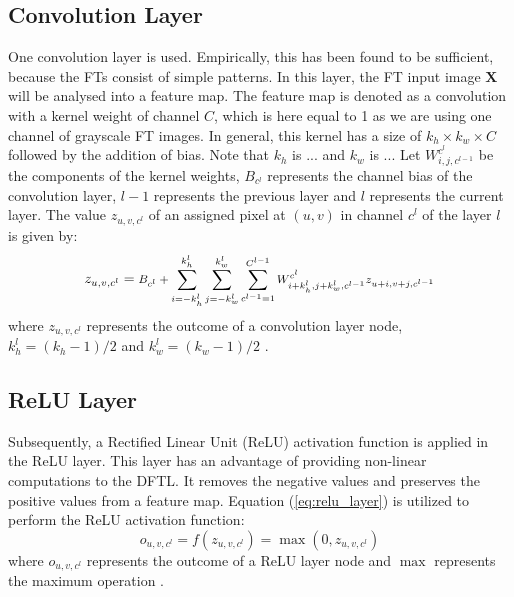 \documentclass[conference]{IEEEtran}
\begin{document}
\subsection{Convolution Layer}
One convolution layer is used. Empirically, this has been found to be sufficient, because the FTs consist of simple patterns. In this layer, the FT input image $\textbf{X}$ will be analysed into a feature map. The feature map is denoted as a convolution with a kernel weight of channel $C$, which is here equal to 1 as we are using one channel of grayscale FT images.  In general, this kernel has a size of $k_h \times k_w \times C$ followed by the addition of bias. Note that $k_h$ is ... and $k_w$ is ... Let $W_{i,j,c^{l-1}}^{c^{l}}$ be the components of the kernel weights, $B_{c^{l}}$ represents the channel bias of the convolution layer, $l-1$ represents the previous layer and $l$ represents the current layer. The value $z_{u,v,c^{l}}$ of an assigned pixel at $(u,v)$ in channel $c^{l}$ of the layer $l$ is given by:
\begin{equation}
z_{u,v,c^{l}}= \text{\footnotesize $B_{c^{l}}+\sum_{i=-k_h^{l}}^{k_h^{l}}\sum_{j=-k_w^{l}}^{k_w^{l}}\sum_{c^{l-1}=1}^{C^{l-1}} W_{i+k_h^{l},j+k_w^{l},c^{l-1}}^{c^{l}} z_{u+i,v+j,c^{l-1}}$}
\label{eq:conv_layer}
\end{equation}
where $z_{u,v,c^{l}}$ represents the outcome of a convolution layer node, $k_h^{l}=(k_h-1)/2$ and $k_w^{l}=(k_w-1)/2$ \cite{simo2016learning}. 

\subsection{ReLU Layer}
Subsequently, a Rectified Linear Unit (ReLU) activation function is applied in the ReLU layer. This layer has an advantage of providing non-linear computations to the DFTL. It removes the negative values and preserves the positive values from a feature map. Equation (\ref{eq:relu_layer}) is utilized to perform the ReLU activation function:
\begin{equation}
o_{u,v,c^{l}}=f(z_{u,v,c^{l}})=\max(0,z_{u,v,c^{l}})
\label{eq:relu_layer}
\end{equation}
where $o_{u,v,c^{l}}$ represents the outcome of a ReLU layer node and $\max$ represents the maximum operation \cite{krizhevsky2012imagenet}.\\
\end{document}
